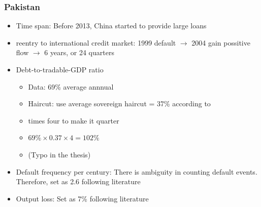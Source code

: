 \documentclass[mathserif]{beamer}
\begin{document}
    \begin{frame}
        \frametitle{Pakistan}
        \begin{itemize}
            \item Time span: Before 2013, China started to provide large loans
            \item reentry to international credit market: 1999 default $\rightarrow$ 2004 gain possitive flow $\rightarrow$ 6 years, or 24 quarters
            \item Debt-to-tradable-GDP ratio
            \begin{itemize}
                \item Data: 69\% average annnual
                \item Haircut: use average sovereign haircut = 37\% according to \citet{Cruces-Trebesch-13}
                \item times four to make it quarter
                \item $69\% \times 0.37 \times 4 = 102\%$
                \item (Typo in the thesis)
            \end{itemize}
            \item Default frequency per century: There is ambiguity in counting default events. Therefore, set as 2.6 following literature
            \item Output loss: Set as 7\% following literature
        \end{itemize}

    \end{frame}
\end{document}
